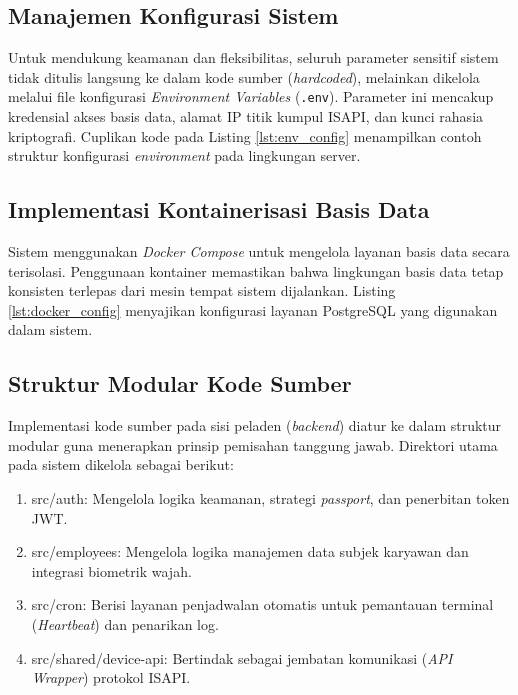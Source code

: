 \subsection{Manajemen Konfigurasi Sistem}
Untuk mendukung keamanan dan fleksibilitas, seluruh parameter sensitif sistem tidak ditulis langsung ke dalam kode sumber (\textit{hardcoded}), melainkan dikelola melalui file konfigurasi \textit{Environment Variables} (\texttt{.env}). Parameter ini mencakup kredensial akses basis data, alamat IP titik kumpul ISAPI, dan kunci rahasia kriptografi. Cuplikan kode pada Listing \ref{lst:env_config} menampilkan contoh struktur konfigurasi \textit{environment} pada lingkungan server.



\subsection{Implementasi Kontainerisasi Basis Data}
Sistem menggunakan \textit{Docker Compose} untuk mengelola layanan basis data secara terisolasi. Penggunaan kontainer memastikan bahwa lingkungan basis data tetap konsisten terlepas dari mesin tempat sistem dijalankan. Listing \ref{lst:docker_config} menyajikan konfigurasi layanan PostgreSQL yang digunakan dalam sistem.



\subsection{Struktur Modular Kode Sumber}
Implementasi kode sumber pada sisi peladen (\textit{backend}) diatur ke dalam struktur modular guna menerapkan prinsip pemisahan tanggung jawab. Direktori utama pada sistem dikelola sebagai berikut:

\begin{enumerate}
    \item src/auth: Mengelola logika keamanan, strategi \textit{passport}, dan penerbitan token JWT.
    \item src/employees: Mengelola logika manajemen data subjek karyawan dan integrasi biometrik wajah.
    \item src/cron: Berisi layanan penjadwalan otomatis untuk pemantauan terminal (\textit{Heartbeat}) dan penarikan log.
    \item src/shared/device-api: Bertindak sebagai jembatan komunikasi (\textit{API Wrapper}) protokol ISAPI.
\end{enumerate}

